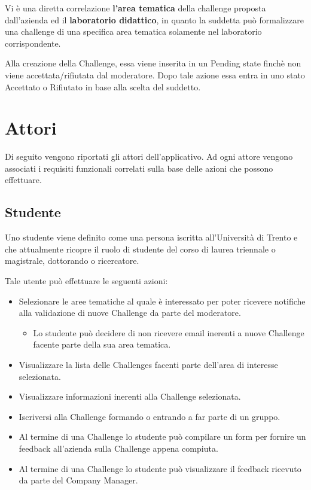 Vi è una diretta correlazione \textbf{l'area tematica} della challenge proposta dall'azienda ed il \textbf{laboratorio didattico}, in quanto la suddetta può formalizzare una challenge di una specifica area tematica solamente nel laboratorio corrispondente.

Alla creazione della Challenge, essa viene inserita in un Pending state finchè non viene accettata/rifiutata dal moderatore. Dopo tale azione essa entra in uno stato Accettato o Rifiutato in base alla scelta del suddetto.

\section{Attori}
Di seguito vengono riportati gli attori dell'applicativo. Ad ogni attore vengono associati i requisiti funzionali correlati sulla base delle azioni che possono effettuare.

\subsection{Studente}
Uno studente viene definito come una persona iscritta all'Università di Trento e che attualmente ricopre il ruolo di studente del corso di laurea triennale o magistrale, dottorando o ricercatore.

Tale utente può effettuare le seguenti azioni:

\begin{itemize}
    \item Selezionare le aree tematiche al quale è interessato per poter ricevere notifiche alla validazione di nuove Challenge da parte del moderatore.
        \begin{itemize}
            \item Lo studente può decidere di non ricevere email inerenti a nuove Challenge facente parte della sua area tematica.
        \end{itemize}
    \item Visualizzare la lista delle Challenges facenti parte dell'area di interesse selezionata.
    \item Visualizzare informazioni inerenti alla Challenge selezionata.
    \item Iscriversi alla Challenge formando o entrando a far parte di un gruppo.
    \item Al termine di una Challenge lo studente può compilare un form per fornire un feedback all'azienda sulla Challenge appena compiuta. 
    \item Al termine di una Challenge lo studente può visualizzare il feedback ricevuto da parte del Company Manager.
\end{itemize}

